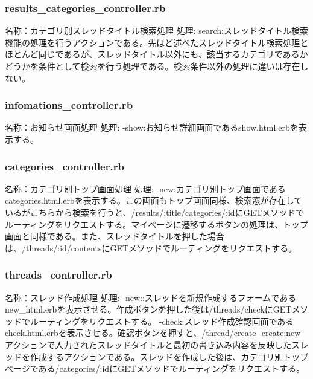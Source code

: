 \documentclass[a4j]{jarticle}
\begin{document}
\subsubsection{results\_categories\_controller.rb}
\noindent 名称：カテゴリ別スレッドタイトル検索処理 \newline
処理:\newline
search:スレッドタイトル検索機能の処理を行うアクションである。先ほど述べたスレッドタイトル検索処理とほとんど同じであるが、スレッドタイトル以外にも、該当するカテゴリであるかどうかを条件として検索を行う処理である。検索条件以外の処理に違いは存在しない。\newline



\subsubsection{infomations\_controller.rb}
\noindent 名称：お知らせ画面処理 \newline
処理:\newline
-show:お知らせ詳細画面であるshow.html.erbを表示する。\newline



\subsubsection{categories\_controller.rb}
\noindent 名称：カテゴリ別トップ画面処理 \newline
処理:\newline
-new:カテゴリ別トップ画面であるcategories.html.erbを表示する。この画面もトップ画面同様、検索窓が存在しているがこちらから検索を行うと、/results/:title/categories/:idにGETメソッドでルーティングをリクエストする。マイページに遷移するボタンの処理は、トップ画面と同様である。また、スレッドタイトルを押した場合は、/threads/:id/contentsにGETメソッドでルーティングをリクエストする。\newline



\subsubsection{threads\_controller.rb}
\noindent 名称：スレッド作成処理 \newline
処理:\newline
-new::スレッドを新規作成するフォームであるnew\_html.erbを表示させる。作成ボタンを押した後は/threads/checkにGETメソッドでルーティングをリクエストする。\newline
-check:スレッド作成確認画面であるcheck.html.erbを表示させる。確認ボタンを押すと、/thread/create\newline
-create:newアクションで入力されたスレッドタイトルと最初の書き込み内容を反映したスレッドを作成するアクションである。スレッドを作成した後は、カテゴリ別トップページである/categories/:idにGETメソッドでルーティングをリクエストする。
\end{document}
